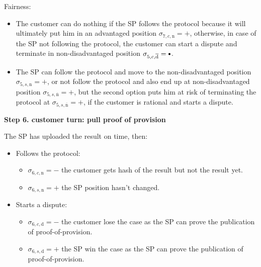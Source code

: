 \documentclass{ieeeaccess}
\newcommand\sbullet[1][.75]{\mathbin{\ThisStyle{\vcenter{\hbox{%
  \scalebox{#1}{$\SavedStyle\bullet$}}}}}%
}
\begin{document}
Fairness:

\begin{itemize}

\item
  The customer can do nothing if the SP follows the protocol because it
  will ultimately put him in an advantaged position
  \(\sigma_{7, c, \mathrm{n}} = +\), otherwise, in case of the SP not
  following the protocol, the customer can start a dispute and terminate
  in non-disadvantaged position
  \(\sigma_{5, c, \overline{\mathrm{d}}} = \sbullet\).
\item
  The SP can follow the protocol and move to the non-disadvantaged
  position \(\sigma_{5, s, \mathrm{n}} = +\), or not follow the protocol
  and also end up at non-disadvantaged position
  \(\sigma_{5, s, \overline{\mathrm{n}}} = +\), but the second option
  puts him at risk of terminating the protocol at
  \(\sigma_{5, s, \overline{\mathrm{n}}} = +\), if the customer is
  rational and starts a dispute.
\end{itemize}


\noindent \textbf
{Step 6. customer turn: pull proof of provision}\label{step-6-pull-proof-of-provision}

The SP has uploaded the result on time, then:

\begin{itemize}
\item
  Follows the protocol:

  \begin{itemize}
  
  \item
    \(\sigma_{6, c, \mathrm{n}} = -\) the customer gets hash of the
    result but not the result yet.
  \item
    \(\sigma_{6, s, \mathrm{n}} = +\) the SP position hasn't changed.
  \end{itemize}
\item
  Starts a dispute:

  \begin{itemize}
  
  \item
    \(\sigma_{6, c, \mathrm{d}} = -\) the customer lose the case as the
    SP can prove the publication of proof-of-provision.
  \item
    \(\sigma_{6, s, \mathrm{d}} = +\) the SP win the case as the SP can
    prove the publication of proof-of-provision.
  \end{itemize}
\end{itemize}
\end{document}
